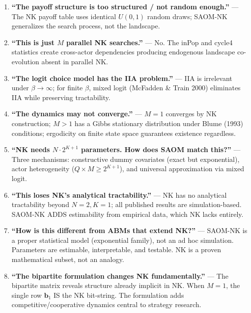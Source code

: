 \documentclass[12pt]{article}
\begin{document}
\bigskip

\begin{enumerate}
  \item \textbf{``The payoff structure is too structured / not random enough.''}
    --- The NK payoff table uses identical $U(0,1)$ random draws; SAOM-NK
    generalizes the search process, not the landscape.

  \item \textbf{``This is just $M$ parallel NK searches.''}
    --- No. The inPop and cycle4 statistics create cross-actor dependencies
    producing endogenous landscape co-evolution absent in parallel NK.

  \item \textbf{``The logit choice model has the IIA problem.''}
    --- IIA is irrelevant under $\beta\to\infty$; for finite $\beta$, mixed
    logit (McFadden \& Train 2000) eliminates IIA while preserving
    tractability.

  \item \textbf{``The dynamics may not converge.''}
    --- $M=1$ converges by NK construction; $M>1$ has a Gibbs stationary
    distribution under Blume (1993) conditions; ergodicity on finite state
    space guarantees existence regardless.

  \item \textbf{``NK needs $N \cdot 2^{K+1}$ parameters. How does SAOM
    match this?''}
    --- Three mechanisms: constructive dummy covariates (exact but
    exponential), actor heterogeneity ($Q \times M \geq 2^{K+1}$), and
    universal approximation via mixed logit.

  \item \textbf{``This loses NK's analytical tractability.''}
    --- NK has no analytical tractability beyond $N=2, K=1$; all published
    results are simulation-based. SAOM-NK ADDS estimability from empirical
    data, which NK lacks entirely.

  \item \textbf{``How is this different from ABMs that extend NK?''}
    --- SAOM-NK is a proper statistical model (exponential family), not an
    ad hoc simulation. Parameters are estimable, interpretable, and
    testable. NK is a proven mathematical subset, not an analogy.

  \item \textbf{``The bipartite formulation changes NK fundamentally.''}
    --- The bipartite matrix reveals structure already implicit in NK.
    When $M=1$, the single row $\mathbf{b}_1$ IS the NK bit-string.
    The formulation adds competitive/cooperative dynamics central to
    strategy research.
\end{enumerate}
\end{document}
